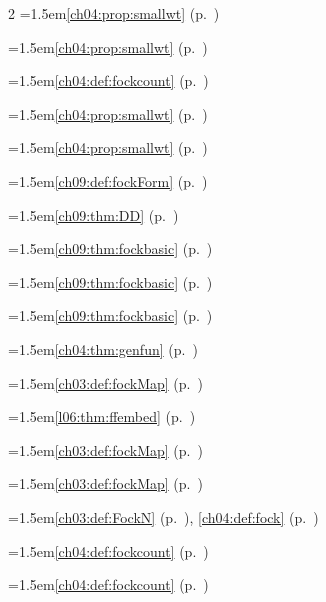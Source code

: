 \begin{multicols}{2}
\hangindent=1.5em\quad \ref{ch04:prop:smallwt} (p.~\pageref{ch04:prop:smallwt})\par
\hangindent=1.5em\quad \ref{ch04:prop:smallwt} (p.~\pageref{ch04:prop:smallwt})\par
\hangindent=1.5em\quad \ref{ch04:def:fockcount} (p.~\pageref{ch04:def:fockcount})\par
\hangindent=1.5em\quad \ref{ch04:prop:smallwt} (p.~\pageref{ch04:prop:smallwt})\par
\hangindent=1.5em\quad \ref{ch04:prop:smallwt} (p.~\pageref{ch04:prop:smallwt})\par
\hangindent=1.5em\quad \ref{ch09:def:fockForm} (p.~\pageref{ch09:def:fockForm})\par
\hangindent=1.5em\quad \ref{ch09:thm:DD} (p.~\pageref{ch09:thm:DD})\par
\hangindent=1.5em\quad \ref{ch09:thm:fockbasic} (p.~\pageref{ch09:thm:fockbasic})\par
\hangindent=1.5em\quad \ref{ch09:thm:fockbasic} (p.~\pageref{ch09:thm:fockbasic})\par
\hangindent=1.5em\quad \ref{ch09:thm:fockbasic} (p.~\pageref{ch09:thm:fockbasic})\par
\hangindent=1.5em\quad \ref{ch04:thm:genfun} (p.~\pageref{ch04:thm:genfun})\par
\hangindent=1.5em\quad \ref{ch03:def:fockMap} (p.~\pageref{ch03:def:fockMap})\par
\hangindent=1.5em\quad \ref{l06:thm:ffembed} (p.~\pageref{l06:thm:ffembed})\par
\hangindent=1.5em\quad \ref{ch03:def:fockMap} (p.~\pageref{ch03:def:fockMap})\par
\hangindent=1.5em\quad \ref{ch03:def:fockMap} (p.~\pageref{ch03:def:fockMap})\par
\hangindent=1.5em\quad \ref{ch03:def:FockN} (p.~\pageref{ch03:def:FockN}), \ref{ch04:def:fock} (p.~\pageref{ch04:def:fock})\par
\hangindent=1.5em\quad \ref{ch04:def:fockcount} (p.~\pageref{ch04:def:fockcount})\par
\hangindent=1.5em\quad \ref{ch04:def:fockcount} (p.~\pageref{ch04:def:fockcount})\par

\end{multicols}
